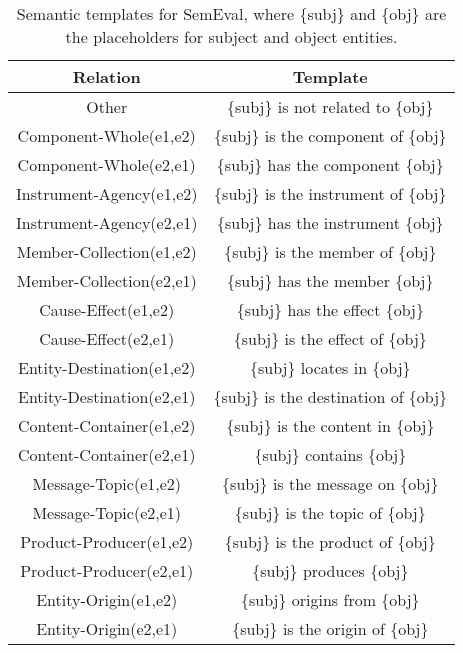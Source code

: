 \begin{table*}[h]
    \centering
    \begin{threeparttable}
    \small
    \begin{tabular}{cc}
    \toprule
    Relation & Template \\
    \midrule
    Other & \{subj\} is not related to \{obj\}\\
    Component-Whole(e1,e2) & \{subj\} is the component of \{obj\}\\
    Component-Whole(e2,e1) & \{subj\} has the component \{obj\}\\
    Instrument-Agency(e1,e2) & \{subj\} is the instrument of \{obj\}\\
    Instrument-Agency(e2,e1) & \{subj\} has the instrument \{obj\}\\
    Member-Collection(e1,e2) & \{subj\} is the member of \{obj\}\\
    Member-Collection(e2,e1) & \{subj\} has the member \{obj\}\\
    Cause-Effect(e1,e2) & \{subj\} has the effect \{obj\}\\
    Cause-Effect(e2,e1) & \{subj\} is the effect of \{obj\}\\
    Entity-Destination(e1,e2) & \{subj\} locates in \{obj\}\\
    Entity-Destination(e2,e1) & \{subj\} is the destination of \{obj\}\\
    Content-Container(e1,e2) & \{subj\} is the content in \{obj\}\\
    Content-Container(e2,e1) & \{subj\} contains \{obj\}\\
    Message-Topic(e1,e2) & \{subj\} is the message on \{obj\}\\
    Message-Topic(e2,e1) & \{subj\} is the topic of \{obj\}\\
    Product-Producer(e1,e2) & \{subj\} is the product of \{obj\}\\
    Product-Producer(e2,e1) & \{subj\} produces \{obj\}\\
    Entity-Origin(e1,e2) & \{subj\} origins from \{obj\}\\
    Entity-Origin(e2,e1) & \{subj\} is the origin of \{obj\}\\
 \bottomrule
    \end{tabular}
    \end{threeparttable}
    \caption{Semantic templates for SemEval, where \{subj\} and \{obj\} are the placeholders for subject and object entities.}
    \label{tab:semantic1-templates-semeval}
\end{table*}

